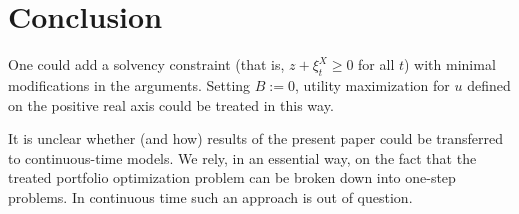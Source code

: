 \documentclass[a4paper]{article}
\newtheorem{lemma}[theorem]{Lemma}
\newtheorem{corollary}[theorem]{Corollary}
\begin{document}
%
%
%
%
%
%	
%
%
%
%



\section{Conclusion}\label{conclu}

One could add a solvency constraint (that is, $z+\xi^{X}_{t}\geq 0$ for all $t$) with minimal modifications
in the arguments. Setting $B:=0$, utility maximization for $u$ defined on the positive real axis 
could be treated in this way.{}

It is unclear whether (and how) results of the present paper could be transferred to continuous-time models.
We rely, in an essential way, on the fact that the treated portfolio optimization problem can be broken down into one-step
problems. In continuous time such an approach is out of question.
\end{document}
